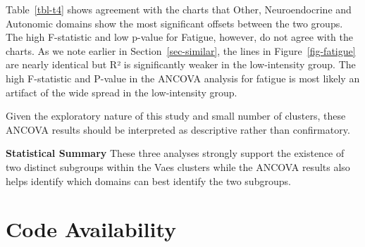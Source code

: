 \documentclass[
  letterpaper,
  DIV=11,
  numbers=noendperiod]{scrartcl}
\begin{document}
\FloatBarrier

\begin{table}[h]

\caption{\label{tbl-t4}ANCOVA Analysis}


\end{table}%

Table~\ref{tbl-t4} shows agreement with the charts that Other,
Neuroendocrine and Autonomic domains show the most significant offsets
between the two groups. The high F-statistic and low p-value for
Fatigue, however, do not agree with the charts. As we note earlier in
Section~\ref{sec-similar}, the lines in Figure~\ref{fig-fatigue} are
nearly identical but R² is significantly weaker in the low-intensity
group. The high F-statistic and P-value in the ANCOVA analysis for
fatigue is most likely an artifact of the wide spread in the
low-intensity group.

Given the exploratory nature of this study and small number of clusters,
these ANCOVA results should be interpreted as descriptive rather than
confirmatory.

\textbf{Statistical Summary} These three analyses strongly support the
existence of two distinct subgroups within the Vaes clusters while the
ANCOVA results also helps identify which domains can best identify the
two subgroups.

\FloatBarrier

\section*{Code Availability}\label{sec-code}
\end{document}
